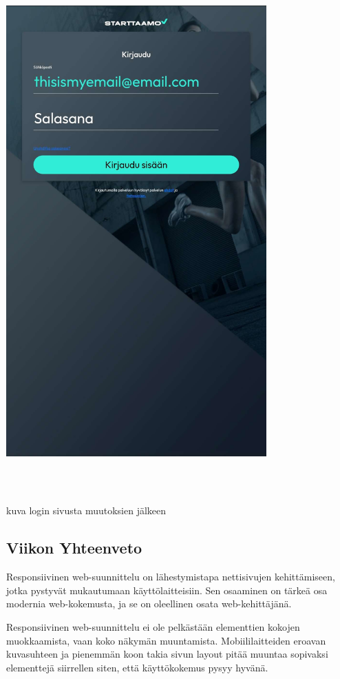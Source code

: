 \includegraphics[width=10cm, height=20cm]{src/public/loginresponsive.jpg} \\
\medskip

kuva login sivusta muutoksien jälkeen
\medskip

\fi



\subsection*{Viikon Yhteenveto}


Responsiivinen web-suunnittelu on lähestymistapa nettisivujen kehittämiseen, jotka pystyvät mukautumaan käyttölaitteisiin. Sen osaaminen on tärkeä osa modernia web-kokemusta, ja se on oleellinen osata web-kehittäjänä.
\medskip


Responsiivinen web-suunnittelu ei ole pelkästään elementtien kokojen muokkaamista, vaan koko näkymän muuntamista.
Mobiililaitteiden eroavan kuvasuhteen ja pienemmän koon takia sivun layout pitää muuntaa sopivaksi elementtejä siirrellen siten, että käyttökokemus pysyy hyvänä. 

\newpage
